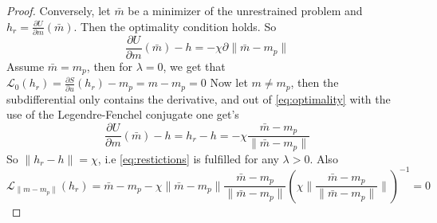\documentclass[a4paper,10pt]{article}
\begin{document}
\begin{proof}
Conversely, let $\bar m$ be a minimizer of the unrestrained problem and $h_r = \frac{\partial U}{\partial m}(\bar m)$. Then the optimality condition holds. So \begin{equation}\label{eq:optimality}
    \frac{\partial U}{\partial m}(\bar m) - h = - \chi \partial\|\bar m - m_p\|
\end{equation}
Assume $\bar m = m_p$, then for $\lambda = 0$, we get that $\mathcal L_0(h_r) = \frac{\partial S}{\partial u}(h_r) - m_p = m - m_p = 0$
Now let $m \neq m_p$, then the subdifferential only contains the derivative, and out of \eqref{eq:optimality} with the use of the Legendre-Fenchel conjugate one get's \begin{equation}
   \frac{\partial U}{\partial m}(\bar m) - h = h_r - h = - \chi \frac{\bar m - m_p}{\|\bar m - m_p\|}
\end{equation}
So $\|h_r - h\| = \chi$, i.e \eqref{eq:restictions} is fulfilled for any $\lambda > 0$.  Also $$\mathcal L_{\|m - m_p\|}(h_r) =\bar m - m_p - \chi \|\bar m - m_p\|\frac{\bar m - m_p}{\|\bar m - m_p\|} (\chi \|\frac{\bar m - m_p}{\|\bar m - m_p\|}\|)^{-1} = 0$$
\end{proof}
\end{document}
